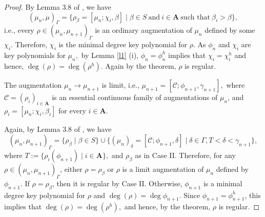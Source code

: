 \documentclass[11pt]{amsart}
\theoremstyle{definition}
\theoremstyle{remark}
\numberwithin{equation}{section}
\begin{document}
\begin{proof}
		 By Lemma 3.8 of \cite{EN1}, we have 
		\[(\mu_n,\mu)_\Gamma=\{\rho_\beta=[\mu_n;\chi_i,\beta]\mid \beta\in S\ \text{and}\ i\in\mathbf{A}\ \text{such that}\ \beta_i>\beta\},\] i.e., every $\rho\in(\mu_n,\mu_{n+1})_\Gamma$ is an ordinary augmentation of $\mu_n$ defined by some $\chi_i$. Therefore, $\chi_i$ is the minimal degree key polynomial for $\rho.$ As $\phi_n$ and $\chi_i$ are key polynomials for $\mu_n,$ by Lemma \ref{l1} (i), $\phi_n=\phi_n^h$ implies that $\chi_i=\chi_i^h$ and hence, $\deg(\rho)=\deg(\rho^h)$. Again by the theorem, $\rho$ is regular.
		
		\smallskip
		 The augmentation $\mu_n\longrightarrow \mu_{n+1}$ is limit, i.e., $\mu_{n+1}=[\mathcal{C};\phi_{n+1},\gamma_{n+1}],$ where $\mathcal{C}=(\rho_i)_{i\in\mathbf{A}}$ is an essential continuous family of augmentations of $\mu_n$, and $\rho_i=[\mu_n;\chi_i,\beta_i]$ for every $i\in\mathbf{A}$.
		
		 \noindent Again, by Lemma 3.8 of \cite{EN1}, we have 
		\[(\mu_n,\mu_{n+1})_\Gamma=\{\rho_\beta\mid \beta\in S\}\cup\{(\mu_n)_\delta=[\mathcal{C};\phi_{n+1},\delta]\mid \delta\in\Gamma, T<\delta<\gamma_{n+1}\},\]
		where $T:=\{\rho_i(\phi_{n+1})\mid i\in\mathbf{A}\},$ and $\rho_\beta$ as in Case II. Therefore, for any $\rho\in(\mu_n,\mu_{n+1})_\Gamma$, either $\rho=\rho_\beta$ or $\rho$ is a limit augmentation of $\mu_n$ defined by $\phi_{n+1}$. If $\rho=\rho_\beta$, then it is regular by Case II. Otherwise, $\phi_{n+1}$ is a minimal degree key polynomial for $\rho$ and $\deg(\rho)=\deg\phi_{n+1}.$ Since $\phi_{n+1}=\phi_{n+1}^h$, this implies that $\deg(\rho)=\deg(\rho^h),$ and hence, by the theorem, $\rho$ is regular.
	\end{proof}
	   
\end{document}
